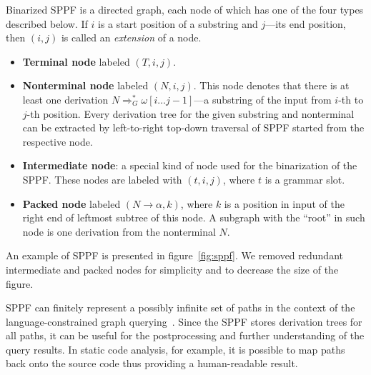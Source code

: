 Binarized SPPF is a directed graph, each node of which has one of the four types described below.
If $i$ is a start position of a substring and $j$---its end position, then $(i,j)$ is called an \emph{extension} of a node.


\begin{itemize}
    \item \textbf{Terminal node} labeled $(T, i, j)$.
    \item \textbf{Nonterminal node} labeled $(N, i, j)$.
    This node denotes that there is at least one derivation $N \Rightarrow^*_G \omega[i \dots j-1]$---a substring of the input from $i$-th to $j$-th position.
    Every derivation tree for the given substring and nonterminal can be extracted by left-to-right top-down traversal of SPPF started from the respective node.
    \item \textbf{Intermediate node}: a special kind of node used for the binarization of the SPPF. These nodes are labeled with $(t,i,j)$, where $t$ is a grammar slot.
    \item \textbf{Packed node} labeled $(N \rightarrow \alpha, k)$, where $k$ is a position in input of the right end of leftmost subtree of this node.
    A subgraph with the ``root'' in such node is one derivation from the nonterminal $N$.

\end{itemize}


An example of SPPF is presented in figure~\ref{fig:sppf}.
We removed redundant intermediate and packed nodes for simplicity and to decrease the size of the figure.

SPPF can finitely represent a possibly infinite set of paths in the context of the language-constrained graph querying~\cite{GrigorevR16}.
Since the SPPF stores derivation trees for all paths, it can be useful for the postprocessing and further understanding of the query results.
In static code analysis, for example, it is possible to map paths back onto the source code thus providing a human-readable result.



